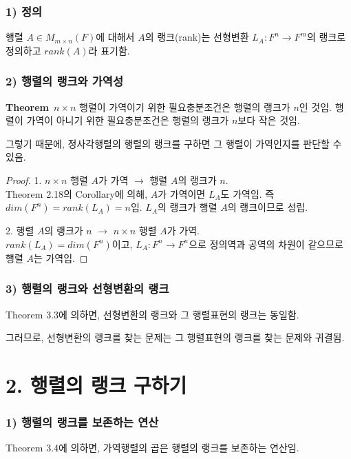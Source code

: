 \subsubsection*{1) 정의\\}
\begin{DEF}
행렬 $A \in M_{m \times n}(F)$에 대해서 $A$의 랭크(rank)는 선형변환 $L_A:F^n \rightarrow F^m$의 랭크로 정의하고 $rank(A)$라 표기함.
\end{DEF}

\subsubsection*{2) 행렬의 랭크와 가역성}
\textbf{Theorem}\, $n \times n$ 행렬이 가역이기 위한 필요충분조건은 행렬의 랭크가 $n$인 것임. 행렬이 가역이 아니기 위한 필요충분조건은 행렬의 랭크가 $n$보다 작은 것임.

그렇기 때문에, 정사각행렬의 행렬의 랭크를 구하면 그 행렬이 가역인지를 판단할 수 있음.

\begin{proof}
1. $n \times n$ 행렬 $A$가 가역 $\rightarrow$ 행렬 $A$의 랭크가 $n$.\\
Theorem 2.18의 Corollary에 의해, $A$가 가역이면 $L_A$도 가역임. 즉 $dim(F^n)=rank(L_A)=n$임. $L_A$의 랭크가 행렬 $A$의 랭크이므로 성립.

2. 행렬 $A$의 랭크가 $n$ $\rightarrow$ $n \times n$ 행렬 $A$가 가역.\\
$rank(L_A)=dim(F^n)$이고, $L_A:F^n \rightarrow F^n$으로 정의역과 공역의 차원이 같으므로 행렬 $A$는 가역임.
\end{proof}

\subsubsection*{3) 행렬의 랭크와 선형변환의 랭크}
Theorem 3.3에 의하면, 선형변환의 랭크와 그 행렬표현의 랭크는 동일함.

그러므로, 선형변환의 랭크를 찾는 문제는 그 행렬표현의 랭크를 찾는 문제와 귀결됨.\\


\section*{2. 행렬의 랭크 구하기}
\subsubsection*{1) 행렬의 랭크를 보존하는 연산}
Theorem 3.4에 의하면, 가역행렬의 곱은 행렬의 랭크를 보존하는 연산임.

